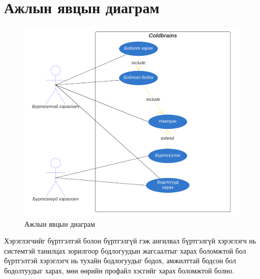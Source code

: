\clearpage

\section{Ажлын явцын диаграм}

\begin{figure}[h]
  \centering
  \includegraphics{img/diagrams/coldbrains-use-case.png}
  \caption{Ажлын явцын диаграм}
\end{figure}

Хэрэглэгчийг бүртгэлтэй болон бүртгэлгүй гэж ангилвал бүртгэлгүй хэрэглэгч нь системтэй танилцах зорилгоор бодлогуудын жагсаалтыг харах боломжтой бол бүртгэлтэй хэрэглэгч нь тухайн бодлогуудыг бодох, амжилттай бодсон бол бодолтуудыг харах, мөн өөрийн профайл хэсгийг харах боломжтой болно.

\clearpage

